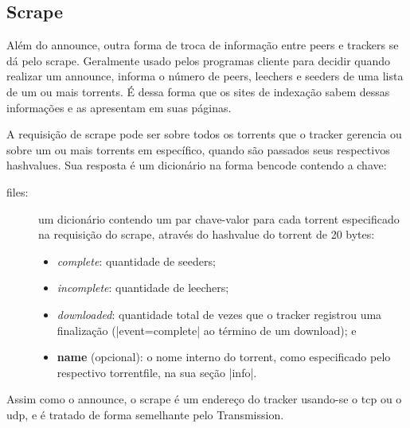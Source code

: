 
\subsection*{Scrape}

Além do \gls*{announce}, outra forma de troca de informação entre \glspl*{peer} e
\glspl*{tracker} se dá pelo \gls{scrape}. Geralmente usado pelos programas cliente para
decidir quando realizar um \gls*{announce}, informa o número de \glspl*{peer},
\glspl*{leecher} e \glspl*{seeder} de uma lista de um ou mais \glspl*{torrent}. É dessa
forma que os sites de indexação sabem dessas informações e as apresentam em suas
páginas.

A requisição de \gls*{scrape} pode ser sobre todos os \glspl*{torrent} que o
\gls*{tracker} gerencia ou sobre um ou mais \glspl*{torrent} em específico, quando são
passados seus respectivos \glspl*{hashvalue}. Sua resposta é um dicionário na forma
\gls*{bencode} contendo a chave:

\begin{description}
    \item[files:] um dicionário contendo um par chave-valor para cada \gls*{torrent}
        especificado na requisição do \gls*{scrape}, através do \gls*{hashvalue} do
        \gls*{torrent} de 20 bytes:

        \begin{itemize}
            \item \emph{complete}: quantidade de \glspl*{seeder};

            \item \emph{incomplete}: quantidade de \glspl*{leecher};

            \item \emph{downloaded}: quantidade total de vezes que o \gls*{tracker}
                registrou uma finalização (\bverb|event=complete| ao término de um
                download); e

            \item \textbf{name} (opcional): o nome interno do \gls*{torrent}, como
                especificado pelo respectivo \gls*{torrentfile}, na sua seção
                \bverb|info|.
        \end{itemize}
\end{description}

Assim como o \gls*{announce}, o \gls*{scrape} é um endereço do \gls*{tracker}
usando-se o \gls*{tcp} ou o \gls*{udp}, e é tratado de forma semelhante pelo
Transmission.

